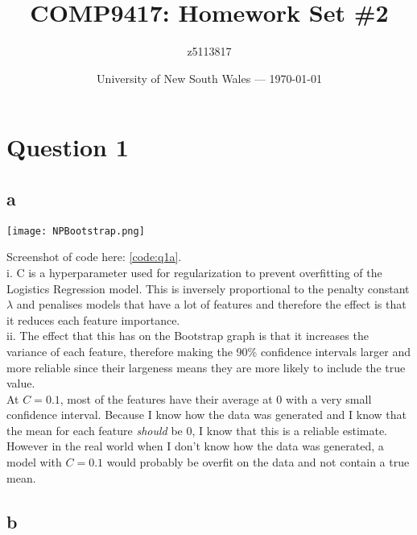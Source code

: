 \documentclass{article}
\title{COMP9417: Homework Set \#2} %
\author{z5113817} %
\date{University of New South Wales --- \today} %
\begin{document}




\section*{Question 1}

\subsection*{a}

\texttt{[image: NPBootstrap.png]}

Screenshot of code here: \ref{code:q1a}.\\

i. C is a hyperparameter used for regularization to prevent overfitting of the Logistics Regression
model. This is inversely proportional to the penalty constant \(\lambda\) and penalises
models that have a lot of features and therefore the effect is that it reduces each feature importance.\\

ii. The effect that this has on the Bootstrap graph is that it increases the variance of 
each feature, therefore making the 90\% confidence intervals larger and more reliable since their largeness means they 
are more likely to include the true value.\\
At \(C = 0.1\), most of the features have their average at 0 with a very small confidence interval. Because I know 
how the data was generated and I know that the mean for each feature \emph{should} be 0, 
I know that this is a reliable estimate. However in the real world when I don't know 
how the data was generated, a model with \(C = 0.1\) would probably be overfit on the 
data and not contain a true mean.\\

\newpage

\subsection*{b}
\end{document}
